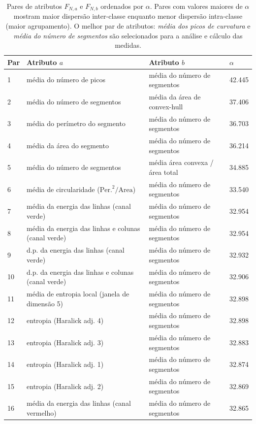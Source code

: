 \begin{table}[ht] \footnotesize
  \begin{center}
  \caption{\label{tab:alpha} Pares de atributos $F_{N, a}$ e $F_{N, b}$
    ordenados por
    $\alpha$. Pares com valores maiores de $\alpha$ mostram maior dispersão
    inter-classe enquanto menor dispersão intra-classe (maior agrupamento).
    O melhor par de atributos: \emph{média dos picos de curvatura} e
    \emph{média do número de segmentos} são selecionados para a análise e
    cálculo das medidas.}
\begin{tabular}{@{}llll}
 \hline \hline
 Par & Atributo $a$    & Atributo $b$   & $\alpha$ \\ 
 
 \hline
 
 1 & média do número de picos & média do número de segmentos & 42.445 \\
 2 & média do número de segmentos & média da área de convex-hull & 37.406 \\
 3 & média do perímetro do segmento & média do número de segmentos & 36.703 \\
 4 & média da área do segmento & média do número de segmentos & 36.214 \\
 5 & média do número de segmentos & média área convexa / área total & 34.885 \\
 6 & média de circularidade ($\mathrm{Per.}^2/\mathrm{Area}$) & média do número
 de segmentos & 33.540 \\
 7 & média da energia das linhas (canal verde) & média do número de segmentos & 32.954 \\
 8 & média da energia das linhas e colunas (canal verde) & média do número de segmentos & 32.954 \\
 9 & d.p. da energia das linhas (canal verde) & média do número de segmentos & 32.932 \\
 10 & d.p. da energia das linhas e colunas (canal verde) & média do número
 de segmentos & 32.906 \\
 11 & média de entropia local (janela de dimensão 5) & média do número de segmentos & 32.898 \\
 12 & entropia (Haralick adj. 4) & média do número de segmentos & 32.898 \\
 13 & entropia (Haralick adj. 3) & média do número de segmentos & 32.883 \\
 14 & entropia (Haralick adj. 1) & média do número de segmentos & 32.874 \\
 15 & entropia (Haralick adj. 2) & média do número de segmentos & 32.869 \\
 16 & média da energia das linhas (canal vermelho) & média do número de segmentos & 32.865 \\
\hline \hline
 \end{tabular}
 \fonteminha
\end{center}
\end{table}

